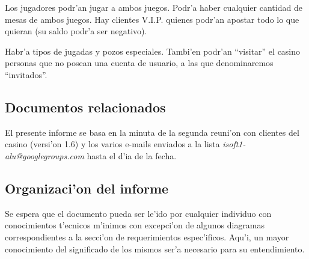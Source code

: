 Los jugadores podr'an jugar a ambos juegos. Podr'a haber cualquier cantidad de mesas de ambos
juegos.
Hay clientes V.I.P. quienes podr'an apostar todo lo que quieran (su saldo podr'a ser negativo).

Habr'a tipos de jugadas y pozos especiales. Tambi'en podr'an ``visitar'' el casino personas que no posean una cuenta de usuario, a las que denominaremos ``invitados''.


\subsection{ Documentos relacionados}
El presente informe se basa en la minuta de la segunda reuni'on con clientes del casino (versi'on 1.6) y los varios e-mails enviados a la lista \textit{isoft1-alu@googlegroups.com} hasta el d'ia de la fecha.


\subsection{ Organizaci'on del informe	}
Se espera que el documento pueda ser le'ido por cualquier individuo con conocimientos t'ecnicos m'inimos con excepci'on de algunos diagramas correspondientes a la secci'on de requerimientos espec'ificos. Aqu'i, un mayor conocimiento del significado de los mismos ser'a necesario para su entendimiento.




